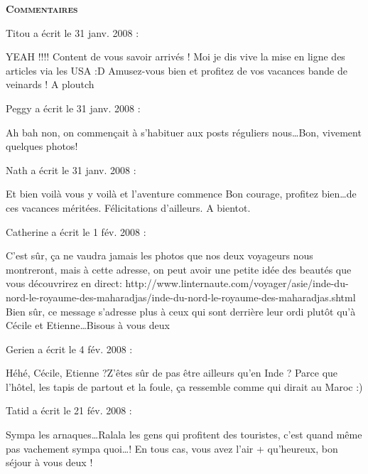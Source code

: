 \bigskip
\textbf{\textsc{Commentaires}}

\medskip
Titou a écrit le 31 janv. 2008 :
\begin{displayquote}
YEAH !!!!
Content de vous savoir arrivés ! Moi je dis vive la mise en ligne des articles via les USA :D Amusez-vous bien et profitez de vos vacances bande de veinards ! A ploutch
\end{displayquote}

\medskip
Peggy a écrit le 31 janv. 2008 :
\begin{displayquote}
Ah bah non, on commençait à s'habituer aux posts réguliers nous\dots Bon, vivement quelques photos!
\end{displayquote}

\medskip
Nath a écrit le 31 janv. 2008 :
\begin{displayquote}
Et bien voilà vous y voilà  et l'aventure commence
Bon courage, profitez bien\dots de ces vacances méritées. Félicitations d'ailleurs.
A bientot.
\end{displayquote}

\medskip
Catherine a écrit le 1 fév. 2008 :
\begin{displayquote}
C'est sûr, ça ne vaudra jamais les photos que nos deux voyageurs nous montreront, mais à cette adresse, on peut avoir une petite idée des beautés que vous découvrirez en direct:
http://www.linternaute.com/voyager/asie/inde-du-nord-le-royaume-des-maharadjas/inde-du-nord-le-royaume-des-maharadjas.shtml
Bien sûr, ce message s'adresse plus à ceux qui sont derrière leur ordi plutôt qu'à Cécile et Etienne\dots Bisous à vous deux
\end{displayquote}

\medskip
Gerien a écrit le 4 fév. 2008 :
\begin{displayquote}
Héhé,
Cécile, Etienne ?Z'êtes sûr de pas être ailleurs qu'en Inde ?
Parce que l'hôtel, les tapis de partout et la foule, ça ressemble comme qui dirait au Maroc :)
\end{displayquote}

\medskip
Tatid a écrit le 21 fév. 2008 :
\begin{displayquote}
Sympa les arnaques\dots Ralala les gens qui profitent des touristes, c'est quand même pas vachement sympa quoi\dots !
En tous cas, vous avez l'air + qu'heureux, bon séjour à vous deux !
\end{displayquote}

\vfill
